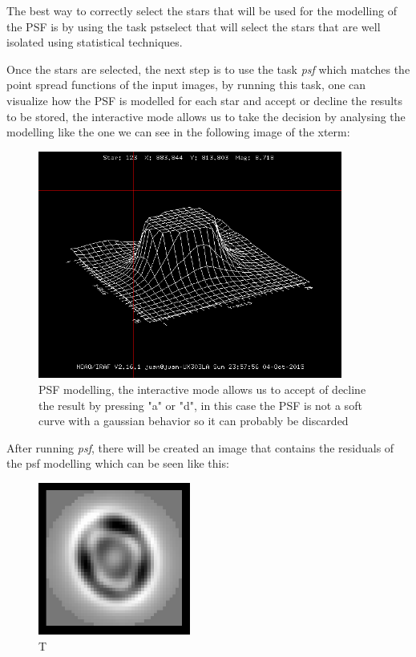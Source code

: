 The best way to correctly select the stars that will be used for the modelling of the PSF is by using the task pstselect that will select the stars that are well isolated using statistical techniques. 

Once the stars are selected, the next step is to use the task \textit{psf} which matches the point spread functions of the input images, by running this task, one can visualize how the PSF is modelled for each star and accept or decline the results to be stored, the interactive mode allows us to take the decision by analysing the modelling like the one we can see in the following image of the xterm:

\begin{figure}[h]
\centering
\includegraphics[width=10cm]{images/psf.png}
\caption{PSF modelling, the interactive mode allows us to accept of decline the result by pressing "a" or "d", in this case the PSF is not a soft curve with a gaussian behavior so it can probably be discarded}
\end{figure}

After running \textit{psf}, there will be created an image that contains the residuals of the psf modelling which can be seen like this:

\begin{figure}[h]
\centering
\includegraphics[width=5cm]{images/psf2.png}
\caption{T}
\end{figure}

